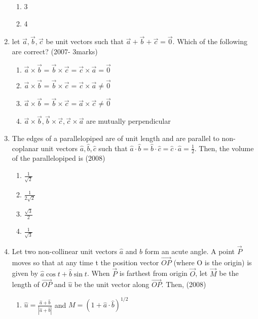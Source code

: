 \documentclass[journal,12pt,onecolumn]{IEEEtran}
\theoremstyle{remark}
\begin{document}
\begin{enumerate}
\begin{multicols}{2}
\begin{enumerate}
    \item 3
    \item 4
    \end{enumerate}
    \end{multicols}
    \item let $\vec{a},\vec{b},\vec{c}$ be unit vectors such that $\vec{a}+\vec{b}+\vec{c}=\vec{0}$. Which of the following are correct?
    \hfill{(2007- 3marks)}
    \begin{enumerate}
    \item $\vec{a} \times \vec{b} = \vec{b} \times \vec{c} = \vec{c} \times \vec{a} = \vec{0}$
    \item $\vec{a} \times \vec{b} = \vec{b} \times \vec{c} = \vec{c} \times \vec{a} \neq \vec{0}$
    \item $\vec{a} \times \vec{b} = \vec{b} \times \vec{c} = \vec{a} \times \vec{c} \neq \vec{0}$
    \item $\vec{a} \times \vec{b}, \vec{b} \times \vec{c}, \vec{c} \times \vec{a}$ are mutually perpendicular
    \end{enumerate}
    \item The edges of a parallelopiped are of unit length and are parallel to non-coplanar unit vectors $\hat{a},\hat{b},\hat{c}$ such that $\hat{a} \cdot \hat{b}= \hat{b} \cdot \hat{c}= \hat{c} \cdot \hat{a}= \frac{1}{2}$. Then, the volume of the parallelopiped is 
    \hfill{(2008)}
    \begin{multicols}{2}
    \begin{enumerate}
    \item $\frac{1}{\sqrt{2}}$
    \item $\frac{1}{2\sqrt{2}}$
    \item $\frac{\sqrt{3}}{2}$
    \item $\frac{1}{\sqrt{3}}$
    \end{enumerate}
    \end{multicols}
    \item Let two non-collinear unit vectors $\hat{a}$ and $\hat{b}$ form an acute angle. A point $\vec{P}$ moves so that at any time t the position vector $\overrightarrow{OP}$ (where O is the origin) is given by $\hat{a}\cos{t} + \hat{b}\sin{t}$. When $\vec{P}$ is farthest from origin $\vec{O}$, let $\vec{M}$ be the length of $\overrightarrow{OP}$ and $\hat{u}$ be the unit vector along $\overrightarrow{OP}$. Then,
    \hfill{(2008)}
    \begin{enumerate}
    \item $\hat{u} = \frac{\hat{a}+\hat{b}}{|\hat{a}+\hat{b}|}$  and $M = (1+\hat{a} \cdot \hat{b})^{1/2}$

\end{enumerate}
\end{enumerate}
\end{document}

